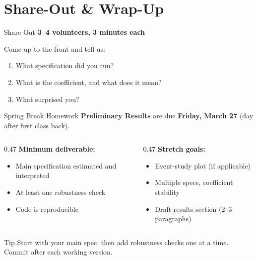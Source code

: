 
\section{Share-Out \& Wrap-Up}

\begin{frame}{Share-Out}
  \textbf{\textcolor{usfgreen}{3--4 volunteers, 3 minutes each}}

  \vspace{8pt}

  Come up to the front and tell us:

  \vspace{4pt}

  \begin{enumerate}
    \item What specification did you run?
    \item What is the coefficient, and what does it mean?
    \item What surprised you?
  \end{enumerate}
\end{frame}

\begin{frame}{Spring Break Homework}
  \textbf{Preliminary Results} are due \textbf{Friday, March 27} (day after first class back).

  \vspace{6pt}

  \begin{columns}[T]
    \begin{column}{0.47\textwidth}
      \textbf{Minimum deliverable:}
      \begin{itemize}
        \item Main specification estimated and interpreted
        \item At least one robustness check
        \item Code is reproducible
      \end{itemize}
    \end{column}
    \begin{column}{0.47\textwidth}
      \textbf{Stretch goals:}
      \begin{itemize}
        \item Event-study plot (if applicable)
        \item Multiple specs, coefficient stability
        \item Draft results section (2--3 paragraphs)
      \end{itemize}
    \end{column}
  \end{columns}

  \vspace{6pt}

  \begin{block}{Tip}
    Start with your main spec, then add robustness checks one at a time. Commit after each working version.
  \end{block}
\end{frame}

